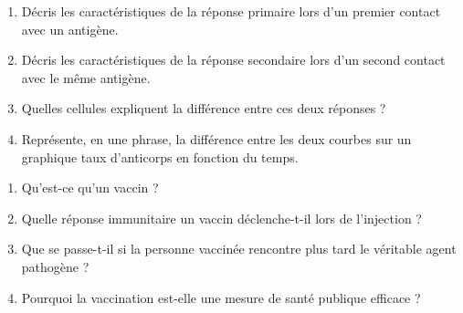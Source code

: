 \begin{enumerate}[label=\arabic*)]
\item Décris les caractéristiques de la réponse primaire lors d'un premier contact avec
un antigène.
\item Décris les caractéristiques de la réponse secondaire lors d'un second contact avec
le même antigène.
\item Quelles cellules expliquent la différence entre ces deux réponses ?
\item Représente, en une phrase, la différence entre les deux courbes sur un graphique
taux d'anticorps en fonction du temps.
\end{enumerate}

\sujetbac[La vaccination]
\begin{enumerate}[label=\arabic*)]
\item Qu'est-ce qu'un vaccin ?
\item Quelle réponse immunitaire un vaccin déclenche-t-il lors de l'injection ?
\item Que se passe-t-il si la personne vaccinée rencontre plus tard le véritable agent
pathogène ?
\item Pourquoi la vaccination est-elle une mesure de santé publique efficace ?
\end{enumerate}

